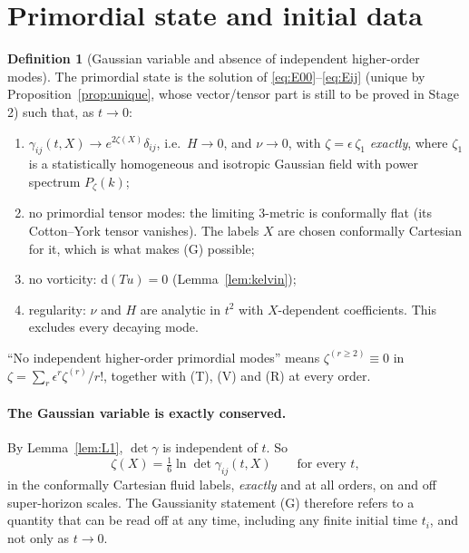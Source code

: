 \documentclass[11pt]{article}
\theoremstyle{definition}
\newtheorem{definition}{Definition}
\theoremstyle{remark}
\newcommand{\eps}{\epsilon}
\newcommand{\dd}{\mathrm{d}}
\begin{document}
\section{Primordial state and initial data}\label{sec:ic}

\begin{definition}[Gaussian variable and absence of independent higher-order modes]\label{def:ic}
The primordial state is the solution of
\eqref{eq:E00}--\eqref{eq:Eij} (unique by Proposition~\ref{prop:unique},
whose vector/tensor part is still to be proved in Stage 2) such that, as
$t\to0$:
\begin{enumerate}
\item[(G)] $\gamma_{ij}(t,X)\to e^{2\zeta(X)}\delta_{ij}$, i.e.\ $H\to0$, and
$\nu\to0$, with $\zeta=\eps\,\zeta_1$ \emph{exactly}, where $\zeta_1$ is a
statistically homogeneous and isotropic Gaussian field with power spectrum
$P_\zeta(k)$;
\item[(T)] no primordial tensor modes: the limiting 3-metric is conformally
flat (its Cotton--York tensor vanishes). The labels $X$ are chosen
conformally Cartesian for it, which is what makes (G) possible;
\item[(V)] no vorticity: $\dd(Tu)=0$ (Lemma~\ref{lem:kelvin});
\item[(R)] regularity: $\nu$ and $H$ are analytic in $t^2$ with
$X$-dependent coefficients. This excludes every decaying mode.
\end{enumerate}
``No independent higher-order primordial modes'' means
$\zeta^{(r\ge2)}\equiv0$ in $\zeta=\sum_r\eps^r\zeta^{(r)}/r!$, together with
(T), (V) and (R) at every order.
\end{definition}

\paragraph{The Gaussian variable is exactly conserved.} By
Lemma~\ref{lem:L1}, $\det\gamma$ is independent of $t$. So
\[
\zeta(X)=\tfrac16\ln\det\gamma_{ij}(t,X)\qquad\text{for every }t,
\]
in the conformally Cartesian fluid labels, \emph{exactly} and at all orders,
on and off super-horizon scales. The Gaussianity statement (G) therefore
refers to a quantity that can be read off at any time, including any finite
initial time $t_i$, and not only as $t\to0$.
\end{document}
